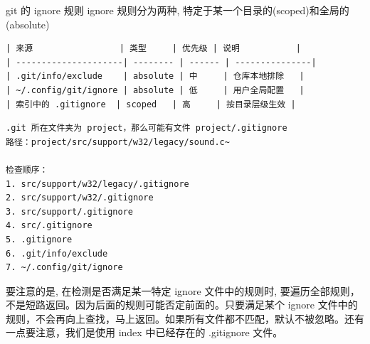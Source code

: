 \documentclass[aspectratio=169,xcolor=dvipsnames]{beamer}
\theoremstyle{remark}
\begin{document}
\begin{frame}{git 的 ignore 规则}
ignore 规则分为两种, 特定于某一个目录的(scoped)和全局的(absolute)
\begin{verbatim}
| 来源                 | 类型     | 优先级 | 说明           |
| ---------------------| -------- | ------ | ---------------|
| .git/info/exclude    | absolute | 中     | 仓库本地排除   |
| ~/.config/git/ignore | absolute | 低     | 用户全局配置   |
| 索引中的 .gitignore  | scoped   | 高     | 按目录层级生效 |
\end{verbatim}
\begin{verbatim}
.git 所在文件夹为 project，那么可能有文件 project/.gitignore
路径：project/src/support/w32/legacy/sound.c~

检查顺序：
1. src/support/w32/legacy/.gitignore
2. src/support/w32/.gitignore
3. src/support/.gitignore
4. src/.gitignore
5. .gitignore
6. .git/info/exclude
7. ~/.config/git/ignore
\end{verbatim}

要注意的是, 在检测是否满足某一特定 ignore 文件中的规则时, 要遍历全部规则，不是短路返回。因为后面的规则可能否定前面的。只要满足某个 ignore 文件中的规则，不会再向上查找，马上返回。如果所有文件都不匹配，默认不被忽略。还有一点要注意，我们是使用 index 中已经存在的 .gitignore 文件。
\end{frame}
\end{document}
